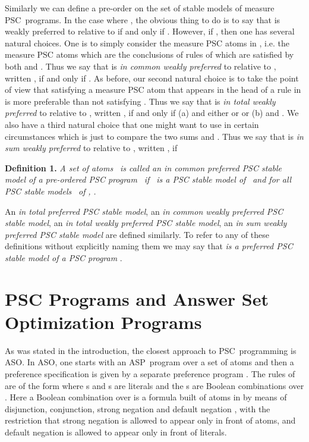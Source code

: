 \documentclass[letterpaper]{article}\usepackage{aaai}
\begin{document}
Similarly we can define a pre-order on the set of stable models of measure
PSC\ programs. In the case where , the obvious
thing to do is to say that  is weakly preferred to  relative to
 if and only if . However, if
, then one has several natural choices. One
is to simply consider the measure PSC atoms in , i.e. the measure PSC atoms which are the conclusions of rules
of  which are satisfied by both  and . Thus we say that
 is \emph{in common weakly preferred} to  relative to ,
written , if and only if . As before, our second natural
choice is to take the point of view that satisfying a measure PSC atom 
that appears in the head of a rule in  is more preferable than not
satisfying . Thus we say that  is \emph{in total weakly preferred}
to  relative to , written , if and
only if (a)  and either  or  or (b)  and
. We also have a
third natural choice that one might want to use in certain circumstances which
is just to compare the two sums  and \newline. Thus we say that 
is \emph{in sum weakly preferred} to  relative to , written
, if



\textbf{Definition 1. }\textit{A set of atoms }\textit{\ is called an in
common preferred PSC stable model of a pre-ordered PSC program }\textit{\ if }\textit{\ is a PSC stable model of }\textit{\ and for
all PSC stable models }\textit{\ of }\textit{, }\textit{.}

An \emph{in total preferred PSC stable model}, an \emph{in common weakly
preferred PSC stable model}, an \emph{in total weakly preferred PSC stable
model}, an \emph{in sum weakly preferred PSC stable model }are defined
similarly. To refer to any of these definitions without explicitly naming them
we may say that  \emph{is a preferred PSC stable model of a PSC program}
.

\section{PSC Programs and Answer Set Optimization Programs}

As was stated in the introduction, the closest approach to PSC\ programming is
ASO. In ASO, one starts with an ASP\ program  over a set of atoms
 and then a preference specification is given by a separate preference
program . The rules of  are of the form
where s and s are literals and the s are Boolean
combinations over . Here a Boolean combination over  is a formula
built of atoms in  by means of disjunction, conjunction, strong negation
 and default negation , with the restriction that strong negation
is allowed to appear only in front of atoms, and default negation is allowed
to appear only in front of literals.
\end{document}
